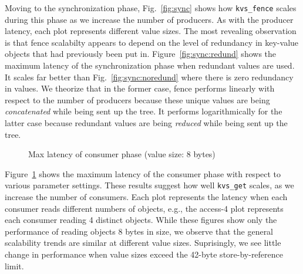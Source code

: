 Moving to the synchronization phase, Fig.~\ref{fig:sync} shows 
how {\tt kvs\_fence} scales during this phase
as we increase the number of producers. 
As with the producer latency,
each plot represents different value sizes.
The most revealing observation is that
fence scalabilty appears to depend on the level of
redundancy in key-value objects that had previously 
been put in. Figure~\ref{fig:sync:redund} 
shows the maximum latency of the synchronization phase
when redundant values are used. It scales
far better than Fig.~\ref{fig:sync:noredund}
where there is zero redundancy in values. 
We theorize that in the former case, fence performs linearly with respect to the number of
producers because these unique values are being {\em concatenated} while
being sent up the tree. It performs logarithmically for the latter case
because redundant values are being {\em reduced} while being sent 
up the tree. %

\ifcomments
{}
\fi

\begin{figure}[ht]
\centering
\begin{subfigure}[With single-directory layout]{
  \texttt{[image: consumer-1-dir]}
  \label{fig:cons:dir}
}%
\end{subfigure}
\begin{subfigure}[Improvements with multiple directories]{
  \texttt{[image: consumer-dist-dir]}
  \label{fig:cons:dirs}
}%
\end{subfigure}
\caption{Max latency of consumer phase (value size: 8 bytes)}
\vspace{-.5cm}
\label{fig:consumer}
\end{figure}

Figure~\ref{fig:consumer} shows the maximum latency of the consumer
phase with respect to various parameter settings. 
These results suggest how well {\tt kvs\_get}
scales, as we increase the number of consumers. Each plot represents
the latency when each consumer reads different numbers of 
objects, e.g., the access-4 plot represents each consumer reading
4 distinct objects.  While these figures show only the performance of reading
objects 8 bytes in size, we observe that the general 
scalability trends are similar at different value sizes.
Suprisingly, we see little change in performance when value sizes
exceed the 42-byte store-by-reference limit.

